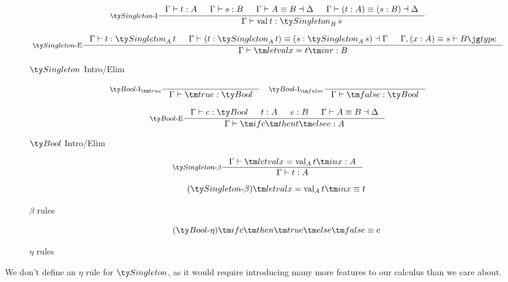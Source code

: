 \begin{figure*}[h]
  \[
  \inference[\Intro{$\Singleton$}]
            { \Gamma \vdash t : A
            & \Gamma \vdash s : B
            & \Gamma \vdash A \equiv B \dashv \Delta
            & \Gamma \vdash (t : A) \equiv (s : B) \dashv \Delta
            }
            {\Gamma \vdash \val[][t] : \Singleton[B][s]}
  \]

  \[
  \inference[\Elim{$\Singleton$}]
            {\Gamma \vdash t : \Singleton[A][t]
            & \Gamma \vdash (t : \Singleton[A][t]) \equiv (s : \Singleton[A][s]) \dashv \Gamma
            & \Gamma, (x : A) \equiv s \vdash \type B}
            {\Gamma \vdash \letval x t r : B}
  \]

  \caption*{$\Singleton$ Intro/Elim}
  \label{fig:base-dt-singleton-intro-elim}
\end{figure*}

\begin{figure*}[h]
  \[
  \inference[\Intro{$\Bool$}$_{\true}$]{}
            {\Gamma \vdash \true : \Bool}
  \quad
  \inference[\Intro{$\Bool$}$_{\false}$]{}
            {\Gamma \vdash \false : \Bool}
  \]

  \[
  \inference[\Elim{$\Bool$}]
            {\Gamma \vdash c : \Bool
            & t : A
            & e : B
            & \Gamma \vdash A \equiv B \dashv \Delta
            }
            {\Gamma \vdash \ite c t e : A}
  \]

  \caption*{$\Bool$ Intro/Elim}
  \label{fig:base-dt-bool-intro-elim}
\end{figure*}



\begin{figure*}[h]
  \[
  \inference[$\Singleton$-$\beta$]
            { \Gamma \vdash \letval x {\val[A][t]} x : A
            }
            {\Gamma \vdash t : A}
  \]

  \begin{equation}
    \tag{$\Singleton$-$\beta$}
    \letval x {\val[A][t]} x \equiv t
  \end{equation}

  \caption*{$\beta$ rules}
  \label{fig:base-dt-beta}
\end{figure*}


\begin{figure*}[h]
  \begin{equation}
    \tag{$\Bool$-$\eta$}
    \ite c \true \false \equiv c
  \end{equation}

  \caption*{$\eta$ rules}
  \label{fig:base-dt-eta}
\end{figure*}

We don't define an $\eta$ rule for $\Singleton$, as it would require introducing many more features to our calculus than we care about.

